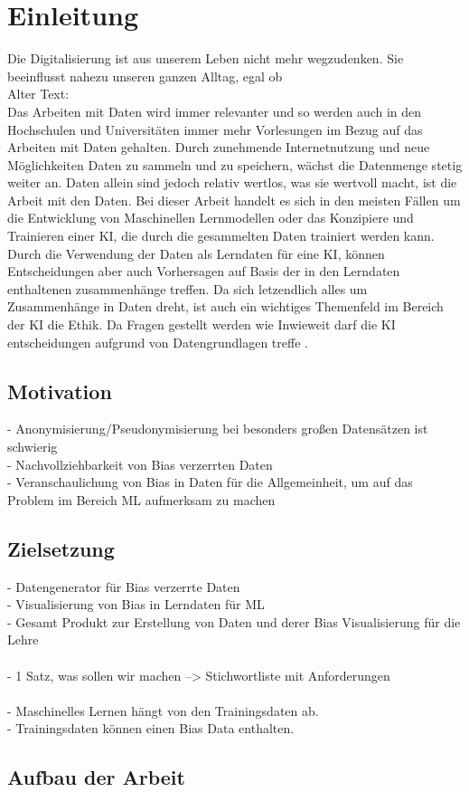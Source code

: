 \chapter{Einleitung}
    \label{sec:einleitung}
    Die Digitalisierung ist aus unserem Leben nicht mehr wegzudenken. Sie beeinflusst nahezu unseren ganzen Alltag, egal ob
    \\
    Alter Text:
    \\
    Das Arbeiten mit Daten wird immer relevanter und so werden auch in den Hochschulen und Universitäten immer mehr Vorlesungen im Bezug auf das Arbeiten mit Daten gehalten. Durch zunehmende Internetnutzung und neue Möglichkeiten Daten zu sammeln und zu speichern, wächst die Datenmenge stetig weiter an. Daten allein sind jedoch relativ wertlos, was sie wertvoll macht, ist die Arbeit mit den Daten. Bei dieser Arbeit handelt es sich in den meisten Fällen um die Entwicklung von Maschinellen Lernmodellen oder das Konzipiere und Trainieren einer \ac{KI}, die durch die gesammelten Daten trainiert werden kann. Durch die Verwendung der Daten als Lerndaten für eine \ac{KI}, können Entscheidungen aber auch Vorhersagen auf Basis der in den Lerndaten enthaltenen zusammenhänge treffen. Da sich letzendlich alles um Zusammenhänge in Daten dreht, ist auch ein wichtiges Themenfeld im Bereich der \ac{KI} die Ethik. Da Fragen gestellt werden wie \dq Inwieweit darf die \ac{KI} entscheidungen aufgrund von Datengrundlagen treffe \dq. \cite{dullien2018}

    \section{Motivation}
    \label{subsec:motivation}

    -	Anonymisierung/Pseudonymisierung bei besonders gro{\ss}en Datensätzen ist schwierig \\
    -	Nachvollziehbarkeit von Bias verzerrten Daten \\
    -	Veranschaulichung von Bias in Daten für die Allgemeinheit, um auf das Problem im Bereich ML aufmerksam zu machen 

    \section{Zielsetzung}
    \label{subsec:zielsetzung}
    -	Datengenerator für Bias verzerrte Daten \\
    -	Visualisierung von Bias in Lerndaten für ML \\
    -	Gesamt Produkt zur Erstellung von Daten und derer Bias Visualisierung für die Lehre \\
    \\
    -   1 Satz, was sollen wir machen --> Stichwortliste mit Anforderungen \\
    \\
    -   Maschinelles Lernen hängt von den Trainingsdaten ab.\\
    -   Trainingsdaten können einen Bias Data enthalten.\\

    \section{Aufbau der Arbeit}
    \label{subsec:aufbau der arbeit}


    \newpage